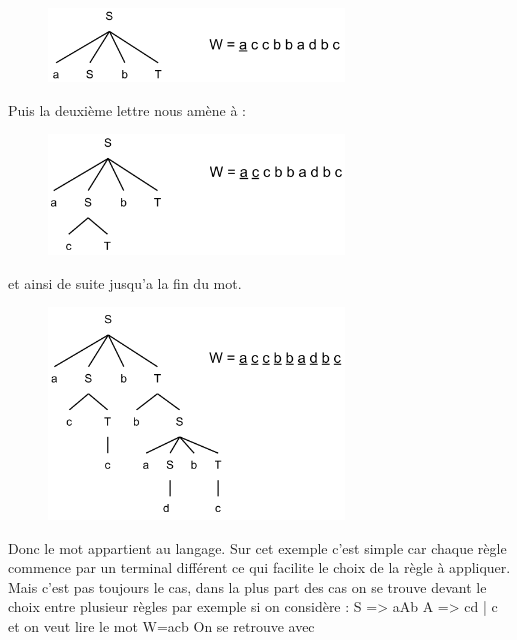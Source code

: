 \documentclass{article}
\begin{document}
\begin{figure}[h!]
	\centering
		\includegraphics[width=0.70\textwidth]{AnalyseDescendante1.png}
	\label{fig:AnalyseDescendante1}
\end{figure}\FloatBarrier

Puis la deuxième lettre nous amène à :

\begin{figure}[h!]
	\centering
		\includegraphics[width=0.70\textwidth]{AnalyseDescendante2.png}
	\label{fig:AnalyseDescendante2}
\end{figure}\FloatBarrier

et ainsi de suite jusqu'a la fin du mot.

\begin{figure}[h!]
	\centering
		\includegraphics[width=0.70\textwidth]{AnalyseDescendante3.png}
	\label{fig:AnalyseDescendante3}
\end{figure}\FloatBarrier

Donc le mot appartient au langage. Sur cet exemple c'est simple car chaque règle commence par un terminal différent ce qui facilite le choix de la règle à appliquer. Mais c'est pas toujours le cas, dans la plus part des cas on se trouve devant le choix entre plusieur règles par exemple si on considère :\newline
S => aAb\newline
A => cd | c \newline
et on veut lire le mot W=acb\newline
On se retrouve avec
\end{document}
